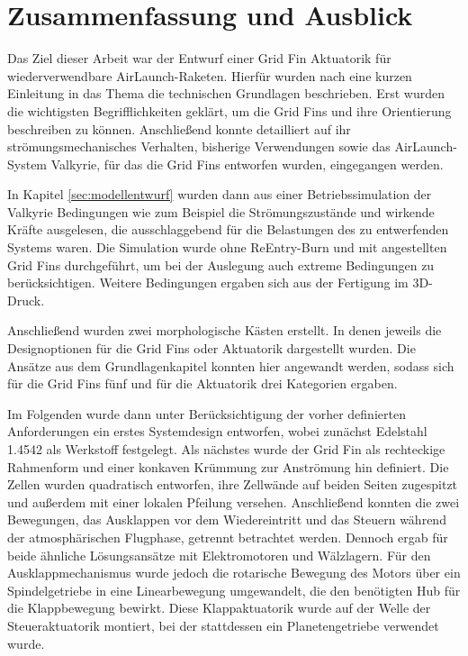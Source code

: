 \chapter{Zusammenfassung und Ausblick}
Das Ziel dieser Arbeit war der Entwurf einer Grid Fin Aktuatorik für wiederverwendbare AirLaunch-Raketen. Hierfür wurden nach eine kurzen Einleitung in das Thema die technischen Grundlagen beschrieben. Erst wurden die wichtigsten Begrifflichkeiten geklärt, um die Grid Fins und ihre Orientierung beschreiben zu können. Anschließend konnte detailliert auf ihr strömungsmechanisches Verhalten, bisherige Verwendungen sowie das AirLaunch-System Valkyrie, für das die Grid Fins entworfen wurden, eingegangen werden.

In Kapitel \ref{sec:modellentwurf} wurden dann aus einer Betriebssimulation der Valkyrie Bedingungen wie zum Beispiel die Strömungszustände und wirkende Kräfte ausgelesen, die ausschlaggebend für die Belastungen des zu entwerfenden Systems waren. Die Simulation wurde ohne ReEntry-Burn und mit angestellten Grid Fins durchgeführt, um bei der Auslegung auch extreme Bedingungen zu berücksichtigen. Weitere Bedingungen ergaben sich aus der Fertigung im 3D-Druck.

Anschließend wurden zwei morphologische Kästen erstellt. In denen jeweils die Designoptionen für die Grid Fins oder Aktuatorik dargestellt wurden. Die Ansätze aus dem Grundlagenkapitel konnten hier angewandt werden, sodass sich für die Grid Fins fünf und für die Aktuatorik drei Kategorien ergaben.

Im Folgenden wurde dann unter Berücksichtigung der vorher definierten Anforderungen ein erstes Systemdesign entworfen, wobei zunächst Edelstahl 1.4542 als Werkstoff festgelegt. Als nächstes wurde der Grid Fin als rechteckige Rahmenform und einer konkaven Krümmung zur Anströmung hin definiert. Die Zellen wurden quadratisch entworfen, ihre Zellwände auf beiden Seiten zugespitzt und außerdem mit einer lokalen Pfeilung versehen. Anschließend konnten die zwei Bewegungen, das Ausklappen vor dem Wiedereintritt und das Steuern während der atmosphärischen Flugphase, getrennt betrachtet werden. Dennoch ergab für beide ähnliche Lösungsansätze mit Elektromotoren und Wälzlagern. Für den Ausklappmechanismus wurde jedoch die rotarische Bewegung des Motors über ein Spindelgetriebe in eine Linearbewegung  umgewandelt, die den benötigten Hub für die Klappbewegung bewirkt. Diese Klappaktuatorik wurde auf der Welle der Steueraktuatorik montiert, bei der stattdessen ein Planetengetriebe verwendet wurde. 

